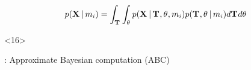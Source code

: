 \begin{frame}[t]
\begin{minipage}[c][0.1\textheight][c]{\linewidth}
\begin{onlyenv}
\begin{displaybox}[0.85\linewidth]
\begin{minipage}[c][0.1\textheight][c]{\linewidth}
\begin{onlyenv}
                        \[
                            p(\alignmentVector \given \divModel{i}) =
                            \int_{\divTimeMapVector} \int_{\allParameters{}}
                            p(\alignmentVector \given \divTimeMapVector, \allParameters{}, \divModel{i})
                            p(\divTimeMapVector, \allParameters{} \given \divModel{i})
                            d\divTimeMapVector d\allParameters{}
                        \]
                    \end{onlyenv}
                    \begin{onlyenv}<16>
                        \vspace{-2mm}
                        \begin{center}
                        \msb: Approximate Bayesian computation (ABC)
                        \end{center}
                    \end{onlyenv}
                \end{minipage}
            \end{displaybox}
        \end{onlyenv}
    \end{minipage}
\end{frame}


